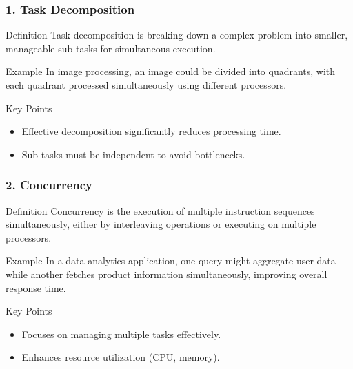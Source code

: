 \documentclass[aspectratio=169]{beamer}
\begin{document}
\begin{frame}[fragile]
    \frametitle{1. Task Decomposition}
    \begin{block}{Definition}
        Task decomposition is breaking down a complex problem into smaller, manageable sub-tasks for simultaneous execution.
    \end{block}
    
    \begin{block}{Example}
        In image processing, an image could be divided into quadrants, with each quadrant processed simultaneously using different processors.
    \end{block}
    
    \begin{block}{Key Points}
        \begin{itemize}
            \item Effective decomposition significantly reduces processing time.
            \item Sub-tasks must be independent to avoid bottlenecks.
        \end{itemize}
    \end{block}
\end{frame}

\begin{frame}[fragile]
    \frametitle{2. Concurrency}
    \begin{block}{Definition}
        Concurrency is the execution of multiple instruction sequences simultaneously, either by interleaving operations or executing on multiple processors.
    \end{block}
    
    \begin{block}{Example}
        In a data analytics application, one query might aggregate user data while another fetches product information simultaneously, improving overall response time.
    \end{block}
    
    \begin{block}{Key Points}
        \begin{itemize}
            \item Focuses on managing multiple tasks effectively.
            \item Enhances resource utilization (CPU, memory).
        \end{itemize}
    \end{block}
\end{frame}
\end{document}
